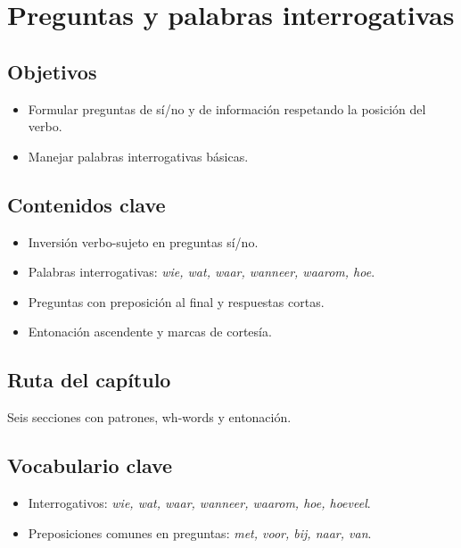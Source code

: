 \chapter{Preguntas y palabras interrogativas}
\section{Objetivos}
\begin{itemize}[leftmargin=*]
	\item Formular preguntas de sí/no y de información respetando la posición del verbo.
	\item Manejar palabras interrogativas básicas.
\end{itemize}

\section{Contenidos clave}
\begin{itemize}[leftmargin=*]
	\item Inversión verbo-sujeto en preguntas sí/no.
	\item Palabras interrogativas: \textit{wie, wat, waar, wanneer, waarom, hoe}.
	\item Preguntas con preposición al final y respuestas cortas.
	\item Entonación ascendente y marcas de cortesía.
\end{itemize}

\section{Ruta del capítulo}
Seis secciones con patrones, wh-words y entonación.








\section{Vocabulario clave}
\begin{itemize}[leftmargin=*]
	\item Interrogativos: \textit{wie, wat, waar, wanneer, waarom, hoe, hoeveel}.
	\item Preposiciones comunes en preguntas: \textit{met, voor, bij, naar, van}.
\end{itemize}

